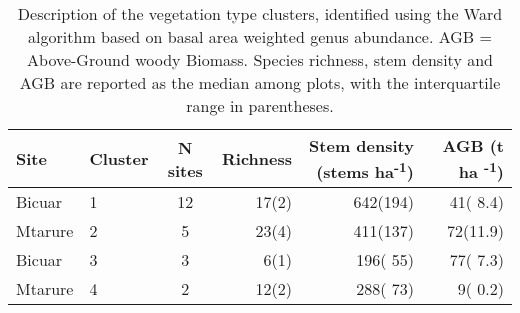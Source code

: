 \begin{table}[]
\centering
\caption{Description of the vegetation type clusters, identified using the Ward algorithm based on basal area weighted genus abundance. AGB = Above-Ground woody Biomass. Species richness, stem density and AGB are reported as the median among plots, with the interquartile range in parentheses.} 
\label{clust_summ}
\begin{tabular}{llS[table-format=2.0]rrr}
  \toprule
{Site} & {Cluster} & {N sites} & {Richness} & {Stem density (stems ha\textsuperscript{-1})} & {AGB (t ha \textsuperscript{-1})} \\ 
  \midrule
Bicuar & 1 & 12 & 17(2) & 642(194) & 41( 8.4) \\ 
  Mtarure & 2 & 5 & 23(4) & 411(137) & 72(11.9) \\ 
  Bicuar & 3 & 3 &  6(1) & 196( 55) & 77( 7.3) \\ 
  Mtarure & 4 & 2 & 12(2) & 288( 73) &  9( 0.2) \\ 
   \bottomrule
\end{tabular}
\end{table}

